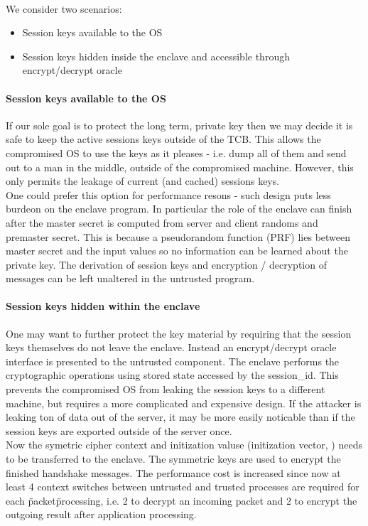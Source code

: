 \documentclass[../main.tex]{subfiles}
\begin{document}
\noindent
\\We consider two scenarios:
\begin{itemize}
	\item Session keys available to the OS
	\item Session keys hidden inside the enclave and accessible through
	encrypt/decrypt oracle
\end{itemize}



\paragraph{Session keys available to the OS}

If our sole goal is to protect the long term, private key then we may decide
it is safe to keep the active sessions keys outside of the TCB. This allows
the compromised OS to use the keys as it pleases - i.e. dump all of them and
send out to a man in the middle, outside of the compromised machine. However,
this only permits the leakage of current (and cached) sessions keys.\\

\noindent
One could prefer this option for performance resons - such design puts less
burdeon on the enclave program. In particular the role of the enclave can
finish after the master secret is computed from server and client randoms and
premaster secret. This is because a pseudorandom function (PRF) lies between
master secret and the input values so no information can be learned about the
private key. The derivation of session keys and encryption / decryption of
messages can be left unaltered in the untrusted program.

\paragraph{Session keys hidden within the enclave}

One may want to further protect the key material by requiring that the session
keys themselves do not leave the enclave. Instead an encrypt/decrypt oracle
interface is presented to the untrusted component. The enclave performs the
cryptographic operations using stored state accessed by the session\_id. This
prevents the compromised OS from leaking the session keys to a different
machine, but requires a more complicated and expensive design. If the attacker
is leaking ton of data out of the server, it may be more easily noticable than
if the session keys are exported outside of the server once.\\

\noindent
Now the symetric cipher context and initization valuse (initization vector, )
needs to be transferred to the enclave. The symmetric keys are used to encrypt
the finished handshake messages. The performance cost is increased since now
at least 4 context switches between untrusted and trusted processes are
required for each \"packet\" processing, i.e. 2 to decrypt an incoming packet
and 2 to encrypt the outgoing result after application processing.\\
\end{document}
